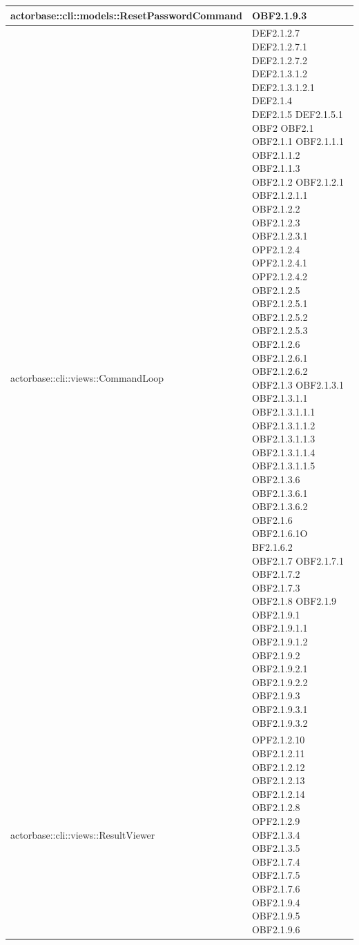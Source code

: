 \documentclass{scalatekids-article}
\begin{document}
\begin{longtable}[H]{|p{11.5cm}|p{5.5cm}|}
\hline
actorbase::cli::models::ResetPasswordCommand & \multiLineCell[t]{OBF2.1.9.3\\}\\
\hline
actorbase::cli::views::CommandLoop & \multiLineCell[t]{DEF2.1.2.7 DEF2.1.2.7.1\\DEF2.1.2.7.2 DEF2.1.3.1.2\\DEF2.1.3.1.2.1 DEF2.1.4\\DEF2.1.5 DEF2.1.5.1\\OBF2 OBF2.1\\OBF2.1.1 OBF2.1.1.1\\OBF2.1.1.2 OBF2.1.1.3\\OBF2.1.2 OBF2.1.2.1\\OBF2.1.2.1.1 OBF2.1.2.2\\OBF2.1.2.3 OBF2.1.2.3.1\\OPF2.1.2.4 OPF2.1.2.4.1\\OPF2.1.2.4.2 OBF2.1.2.5\\OBF2.1.2.5.1 OBF2.1.2.5.2\\OBF2.1.2.5.3 OBF2.1.2.6\\OBF2.1.2.6.1 OBF2.1.2.6.2\\OBF2.1.3 OBF2.1.3.1\\OBF2.1.3.1.1 OBF2.1.3.1.1.1\\OBF2.1.3.1.1.2 OBF2.1.3.1.1.3\\OBF2.1.3.1.1.4 OBF2.1.3.1.1.5\\OBF2.1.3.6 OBF2.1.3.6.1\\OBF2.1.3.6.2 OBF2.1.6\\OBF2.1.6.1O BF2.1.6.2\\OBF2.1.7 OBF2.1.7.1\\OBF2.1.7.2 OBF2.1.7.3\\OBF2.1.8 OBF2.1.9\\OBF2.1.9.1 OBF2.1.9.1.1\\OBF2.1.9.1.2 OBF2.1.9.2\\OBF2.1.9.2.1 OBF2.1.9.2.2\\OBF2.1.9.3 OBF2.1.9.3.1\\OBF2.1.9.3.2}\\
\hline
actorbase::cli::views::ResultViewer & \multiLineCell[t]{OPF2.1.2.10 OBF2.1.2.11\\OBF2.1.2.12 OBF2.1.2.13\\OBF2.1.2.14 OBF2.1.2.8\\OPF2.1.2.9 OBF2.1.3.4\\OBF2.1.3.5 OBF2.1.7.4\\OBF2.1.7.5 OBF2.1.7.6\\OBF2.1.9.4 OBF2.1.9.5\\OBF2.1.9.6}\\

\end{longtable}
\end{document}
